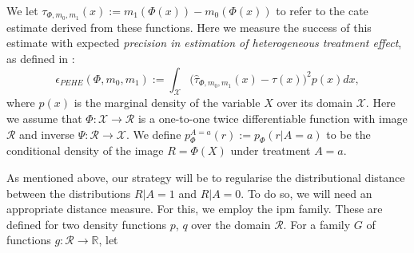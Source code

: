 \documentclass[../thesis.tex]{subfiles}
\begin{document}
We let $\tau_{\Phi, m_0, m_1}(x) := m_1(\Phi(x)) - m_0(\Phi(x))$ to refer to the \gls{cate} estimate derived from these functions. Here we measure the success of this estimate with expected \emph{precision in estimation of heterogeneous treatment effect}, as defined in \citet{hill_bayesian_2011}:
\[
\epsilon_{PEHE}(\Phi, m_0, m_1) :=  \int_{\mathcal{X}} \big(\hat{\tau}_{\Phi, m_0, m_1}(x) - \tau(x) \big)^2p(x) dx, 
\]
where $p(x)$ is the marginal density of the variable $X$ over its domain $\mathcal{X}$. Here we assume that $\Phi \colon \mathcal{X} \rightarrow \mathcal{R}$ is a one-to-one twice differentiable function with image $\mathcal{R}$ and inverse $\Psi \colon \mathcal{R} \rightarrow \mathcal{X}$. We define $p_{\Phi}^{A=a}(r) := p_{\Phi}(r|A=a)$ to be the conditional density of the image $R = \Phi(X)$ under treatment $A=a$. 

As mentioned above, our strategy will be to regularise the distributional distance between the distributions $R | A = 1$ and $R | A =0$. To do so, we will need an appropriate distance measure. For this, we employ the \gls{ipm} family. These are defined for two density functions $p$, $q$ over the domain $\mathcal{R}$. For a family $G$ of functions $g \colon \mathcal{R} \rightarrow \mathbb{R}$, let 
\end{document}
